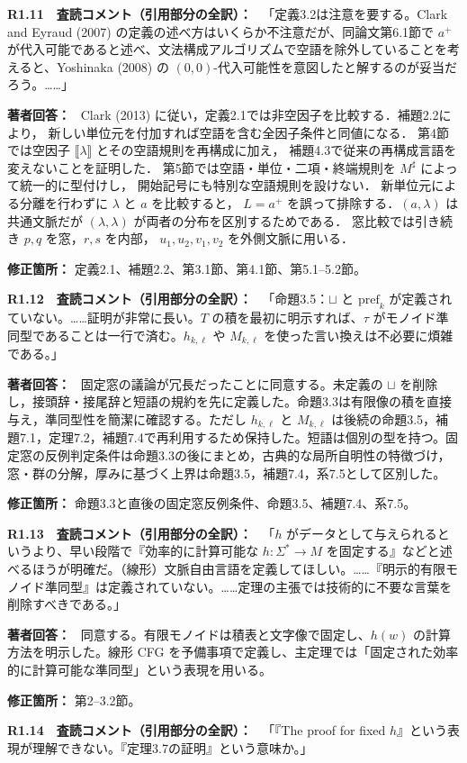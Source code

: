 \documentclass[10pt,a4paper]{ltjsarticle}
\newcommand{\NT}[1]{\llbracket #1\rrbracket}
\newcommand{\Comment}[1]{\par\medskip\noindent\textbf{#1　査読コメント（引用部分の全訳）：}\ }
\newcommand{\Reply}{\par\noindent\textbf{著者回答：}\ }
\newcommand{\Location}[1]{\par\noindent\textbf{修正箇所：} #1\par}
\begin{document}
\Comment{R1.11}
「定義3.2は注意を要する。Clark and Eyraud (2007) の定義の述べ方はいくらか不注意だが、同論文第6.1節で $a^+$ が代入可能であると述べ、文法構成アルゴリズムで空語を除外していることを考えると、Yoshinaka (2008) の $(0,0)$-代入可能性を意図したと解するのが妥当だろう。……」

\Reply
Clark (2013) に従い，定義2.1では非空因子を比較する．補題2.2により，
新しい単位元を付加すれば空語を含む全因子条件と同値になる．
第4節では空因子 $\NT{\lambda}$ とその空語規則を再構成に加え，
補題4.3で従来の再構成言語を変えないことを証明した．
第5節では空語・単位・二項・終端規則を $M^\sharp$ によって統一的に型付けし，
開始記号にも特別な空語規則を設けない．
新単位元による分離を行わずに $\lambda$ と $a$ を比較すると，
$L=a^+$ を誤って排除する．$(a,\lambda)$ は共通文脈だが
$(\lambda,\lambda)$ が両者の分布を区別するためである．
窓比較では引き続き $p,q$ を窓，$r,s$ を内部，
$u_1,u_2,v_1,v_2$ を外側文脈に用いる．
\Location{定義2.1、補題2.2、第3.1節、第4.1節、第5.1--5.2節。}

\Comment{R1.12}
「命題3.5：$\sqcup$ と $\mathrm{pref}_k$ が定義されていない。……証明が非常に長い。$T$ の積を最初に明示すれば、$\tau$ がモノイド準同型であることは一行で済む。$h_{k,\ell}$ や $M_{k,\ell}$ を使った言い換えは不必要に煩雑である。」

\Reply
固定窓の議論が冗長だったことに同意する。未定義の $\sqcup$ を削除し，接頭辞・接尾辞と短語の規約を先に定義した。命題3.3は有限像の積を直接与え，準同型性を簡潔に確認する。ただし $h_{k,\ell}$ と $M_{k,\ell}$ は後続の命題3.5，補題7.1，定理7.2，補題7.4で再利用するため保持した。短語は個別の型を持つ。固定窓の反例判定条件は命題3.3の後にまとめ，古典的な局所自明性の特徴づけ，窓・群の分解，厚みに基づく上界は命題3.5，補題7.4，系7.5として区別した。
\Location{命題3.3と直後の固定窓反例条件、命題3.5、補題7.4、系7.5。}

\Comment{R1.13}
「$h$ がデータとして与えられるというより、早い段階で『効率的に計算可能な $h:\Sigma^*\to M$ を固定する』などと述べるほうが明確だ。（線形）文脈自由言語を定義してほしい。……『明示的有限モノイド準同型』は定義されていない。……定理の主張では技術的に不要な言葉を削除すべきである。」

\Reply
同意する。有限モノイドは積表と文字像で固定し、$h(w)$ の計算方法を明示した。線形 CFG を予備事項で定義し、主定理では「固定された効率的に計算可能な準同型」という表現を用いる。
\Location{第2--3.2節。}

\Comment{R1.14}
「『The proof for fixed $h$』という表現が理解できない。『定理3.7の証明』という意味か。」
\end{document}
